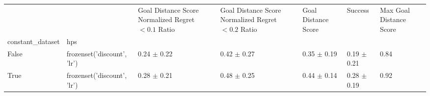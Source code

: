 \begin{tabular}{lllllll}
\toprule
 &  & Goal Distance Score Normalized Regret $< 0.1$ Ratio & Goal Distance Score Normalized Regret $< 0.2$ Ratio & Goal Distance Score & Success & Max Goal Distance Score \\
constant_dataset & hps &  &  &  &  &  \\
\midrule
False & frozenset({'discount', 'lr'}) & 0.24 $\pm$ 0.22 & 0.42 $\pm$ 0.27 & 0.35 $\pm$ 0.19 & 0.19 $\pm$ 0.21 & 0.84 \\
\cline{1-7}
True & frozenset({'discount', 'lr'}) & 0.28 $\pm$ 0.21 & 0.48 $\pm$ 0.25 & 0.44 $\pm$ 0.14 & 0.28 $\pm$ 0.19 & 0.92 \\
\cline{1-7}
\bottomrule
\end{tabular}
